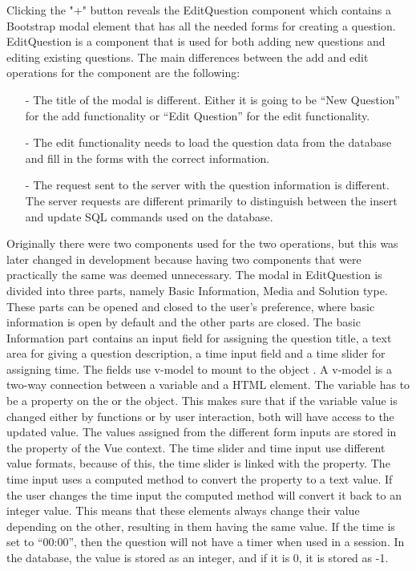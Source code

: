 \noindent
Clicking the "+" button reveals the EditQuestion component which contains a Bootstrap modal element that has all the needed forms for creating a question. EditQuestion is a component that is used for both adding new questions and editing existing questions. The main differences between the add and edit operations for the component are the following:
\begin{itemize}
\item[-] The title of the modal is different. Either it is going to be “New Question” for the add functionality or “Edit Question” for the edit functionality.
\item[-] The edit functionality needs to load the question data from the database and fill in the forms with the correct information. 
\item[-] The request sent to the server with the question information is different. The server requests are different primarily to distinguish between the insert and update SQL commands used on the database.
\end{itemize} 
Originally there were two components used for the two operations, but this was later changed in development because having two components that were practically the same was deemed unnecessary. The modal in EditQuestion is divided into three parts, namely Basic Information, Media and Solution type.  These parts can be opened and closed to the user’s preference, where basic information is open by default and the other parts are closed. The basic Information part contains an input field for assigning the question title, a text area for giving a question description, a time input field and a time slider for assigning time. The fields use v-model to mount to the object . A v-model is a two-way connection between a variable and a HTML element. The variable has to be a property on the  or the  object. This makes sure that if the variable value is changed either by functions or by user interaction, both will have access to the updated value.  The values assigned from the different form inputs are stored in the  property of the Vue context.
The time slider and time input use different value formats, because of this, the time slider is linked with the  property. The time input uses a computed method to convert the  property to a text value. If the user changes the time input the computed method will convert it back to an integer value. This means that these elements always change their value depending on the other, resulting in them having the same value. If the time is set to “00:00”, then the question will not have a timer when used in a session. In the database, the value is stored as an integer, and if it is 0, it is stored as -1.
